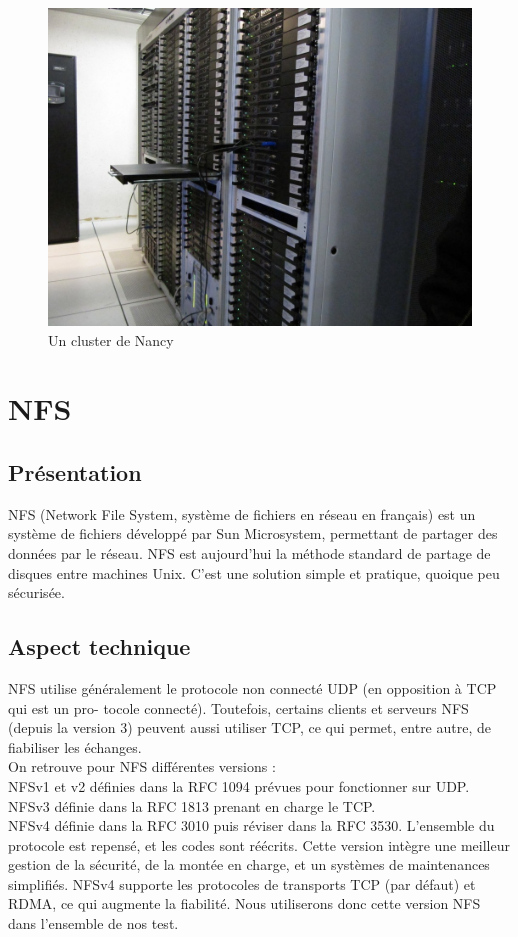 \documentclass[12pt]{report}
\begin{document}
		\begin{figure}[H]
			\begin{center}
				\includegraphics[width=0.6\linewidth]{images/cluster_nancy.jpg}
				\caption{Un cluster de Nancy}
			\end{center}
		\end{figure}
		


	\chapter{NFS}
		\section{Présentation}

		NFS (Network File System, système de fichiers en réseau en français) est un système de fichiers développé par Sun Microsystem,
		permettant de partager des données par le réseau. NFS est aujourd’hui la méthode standard de partage de disques entre machines Unix. 
		C’est une solution simple et pratique, quoique peu sécurisée.\\
		
		\section{Aspect technique}
		
		NFS utilise généralement le protocole non connecté UDP (en opposition à TCP qui est un pro-
    tocole connecté). Toutefois, certains clients et serveurs NFS (depuis la version 3) peuvent aussi
    utiliser TCP, ce qui permet, entre autre, de fiabiliser les échanges.\\

    On retrouve pour NFS différentes versions :\\
    NFSv1 et v2 définies dans la RFC 1094 prévues pour fonctionner sur UDP.\\
    NFSv3 définie dans la RFC 1813 prenant en charge le TCP.\\
    NFSv4 définie dans la RFC 3010 puis réviser dans la RFC 3530. L'ensemble du protocole est repensé, et les codes sont réécrits.
    Cette version intègre une meilleur gestion de la sécurité, de la montée en charge, et un systèmes de maintenances simplifiés.
    NFSv4 supporte les protocoles de transports TCP (par défaut) et RDMA, ce qui augmente la fiabilité. Nous utiliserons donc cette version
    NFS dans l'ensemble de nos test.\\
    
\end{document}
